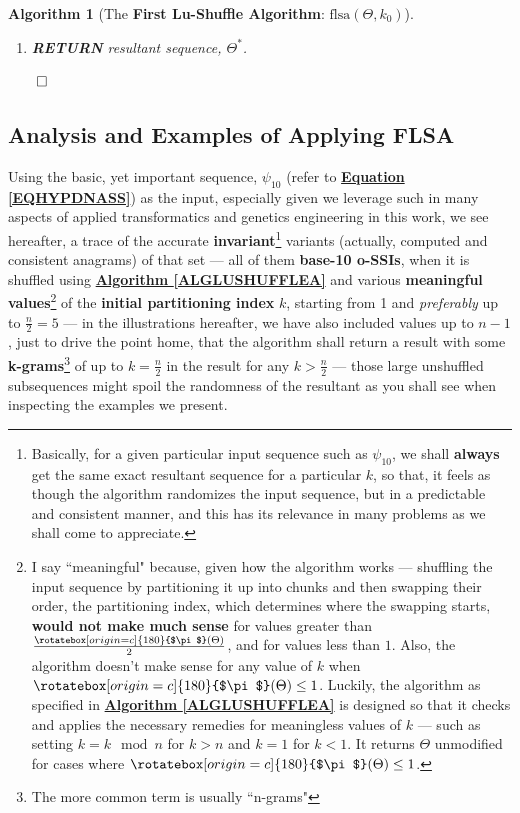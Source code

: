 \documentclass[a4paper, 18pt]{book} %
\newtheorem{alg}{Algorithm}
\newcommand{\invpi}{\rotatebox[origin=c]{180}{$\pi$}}
\begin{document}
\begin{alg}[The \textbf{First Lu-Shuffle Algorithm}: $\text{flsa}(\Theta, k_0)$]
\begin{enumerate}
{\begin{enumerate}
	\item \textbf{INCREMENT} $k$: $k = k + 1$
\end{enumerate}
}
\item \textbf{RETURN} resultant sequence, $\Theta^*$.
\end{enumerate}
$\qed$
\end{alg}


\subsection{Analysis and Examples of Applying FLSA}
\label{SECAPPLYFLSA}

Using the basic, yet important sequence, $\psi_{10}$ (refer to \textbf{\hyperref[EQHYPDNASS]{Equation \ref{EQHYPDNASS}}}) as the input, especially given we leverage such in many aspects of applied transformatics and genetics engineering in this work, we see hereafter, a trace of the accurate \textbf{invariant}\footnote{Basically, for a given particular input sequence such as $\psi_{10}$, we shall \textbf{always} get the same exact resultant sequence for a particular $k$, so that, it feels as though the algorithm randomizes the input sequence, but in a predictable and consistent manner, and this has its relevance in many problems as we shall come to appreciate.} variants (actually, computed and consistent anagrams) of that set --- all of them \textbf{base-10 o-SSIs}\cite{ossipaper}, when it is shuffled using \textbf{\hyperref[ALGLUSHUFFLEA]{Algorithm \ref{ALGLUSHUFFLEA}}} and various \textbf{meaningful values}\footnote{I say ``meaningful" because, given how the algorithm works --- shuffling the input sequence by partitioning it up into chunks and then swapping their order, the partitioning index, which determines where the swapping starts, \textbf{would not make much sense} for values greater than $\frac{\invpi(\Theta)}{2}$, and for values less than $1$. Also, the algorithm doesn't make sense for any value of $k$ when $\invpi(\Theta) \leq 1$. Luckily, the algorithm as specified in \textbf{\hyperref[ALGLUSHUFFLEA]{Algorithm \ref{ALGLUSHUFFLEA}}} is designed so that it checks and applies the necessary remedies for meaningless values of $k$ --- such as setting $k = k \mod n$ for $k > n$ and $k=1$ for $k < 1$. It returns $\Theta$ unmodified for cases where $\invpi(\Theta) \leq 1$.} of the \textbf{initial partitioning index} $k$, starting from 1 and \textit{preferably} up to $\frac{n}{2} = 5$ --- in the illustrations hereafter, we have also included values up to $n-1$, just to drive the point home, that the algorithm shall return a result with some \textbf{k-grams}\footnote{The more common term is usually ``n-grams"} of up to $k = \frac{n}{2}$ in the result for any $k > \frac{n}{2}$ --- those large unshuffled subsequences might spoil the randomness of the resultant as you shall see when inspecting the examples we present. 
\end{document}
